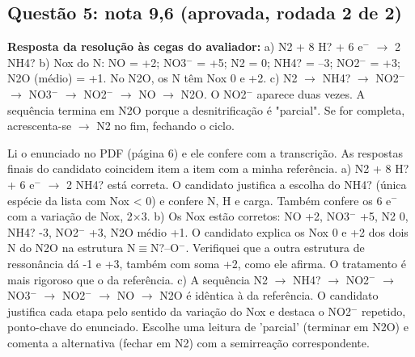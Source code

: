 \documentclass{article}%
\begin{document}
\subsection*{Questão 5: nota 9,6 (aprovada, rodada 2 de 2)}%
\textbf{Resposta da resolução às cegas do avaliador:} a) N2 + 8 H? + 6 e$^{-}$ $\to$ 2 NH4?\newline%
\newline%
b) Nox do N: NO = +2; NO3$^{-}$ = +5; N2 = 0; NH4? = --3; NO2$^{-}$ = +3; N2O (médio) = +1. No N2O, os N têm Nox 0 e +2.\newline%
\newline%
c) N2 $\to$ NH4? $\to$ NO2$^{-}$ $\to$ NO3$^{-}$ $\to$ NO2$^{-}$ $\to$ NO $\to$ N2O. O NO2$^{-}$ aparece duas vezes. A sequência termina em N2O porque a desnitrificação é "parcial". Se for completa, acrescenta{-}se $\to$ N2 no fim, fechando o ciclo.\par %
Li o enunciado no PDF (página 6) e ele confere com a transcrição. As respostas finais do candidato coincidem item a item com a minha referência.\newline%
\newline%
a) N2 + 8 H? + 6 e$^{-}$ $\to$ 2 NH4? está correta. O candidato justifica a escolha do NH4? (única espécie da lista com Nox < 0) e confere N, H e carga. Também confere os 6 e$^{-}$ com a variação de Nox, 2$\times$3.\newline%
\newline%
b) Os Nox estão corretos: NO +2, NO3$^{-}$ +5, N2 0, NH4? -3, NO2$^{-}$ +3, N2O médio +1. O candidato explica os Nox 0 e +2 dos dois N do N2O na estrutura N$\equiv$N?--O$^{-}$. Verifiquei que a outra estrutura de ressonância dá -1 e +3, também com soma +2, como ele afirma. O tratamento é mais rigoroso que o da referência.\newline%
\newline%
c) A sequência N2 $\to$ NH4? $\to$ NO2$^{-}$ $\to$ NO3$^{-}$ $\to$ NO2$^{-}$ $\to$ NO $\to$ N2O é idêntica à da referência. O candidato justifica cada etapa pelo sentido da variação do Nox e destaca o NO2$^{-}$ repetido, ponto{-}chave do enunciado. Escolhe uma leitura de 'parcial' (terminar em N2O) e comenta a alternativa (fechar em N2) com a semirreação correspondente.\newline%
\newline%
\end{document}
